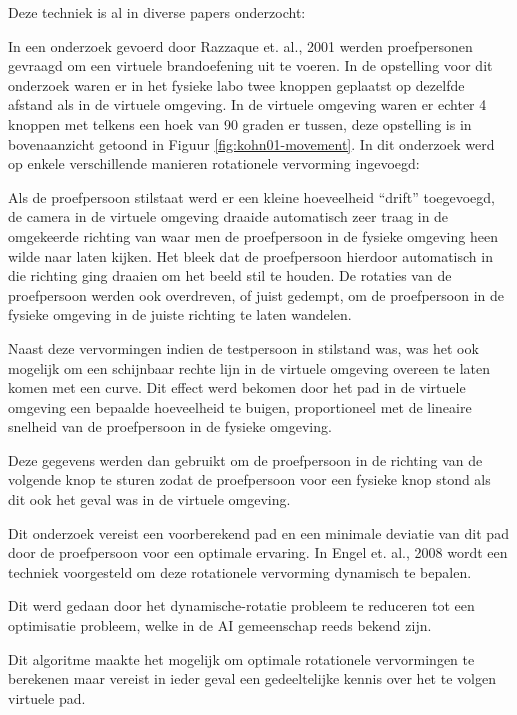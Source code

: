 Deze techniek is al in diverse papers onderzocht:

In een onderzoek gevoerd door Razzaque et. al., 2001 \cite{kohn01} werden 
proefpersonen gevraagd om een virtuele brandoefening uit te voeren. In de 
opstelling voor dit onderzoek waren er in het fysieke labo twee knoppen geplaatst
op dezelfde afstand als in de virtuele omgeving. In de virtuele omgeving waren er
echter 4 knoppen met telkens een hoek van 90 graden er tussen, deze opstelling is
in bovenaanzicht getoond in Figuur \ref{fig:kohn01-movement}. In dit onderzoek
werd op enkele verschillende manieren rotationele vervorming ingevoegd:

Als de proefpersoon stilstaat werd er een kleine hoeveelheid ``drift'' 
toegevoegd, de camera in de virtuele omgeving draaide automatisch zeer traag in 
de omgekeerde richting van waar men de proefpersoon in de fysieke omgeving heen 
wilde naar laten kijken. Het bleek dat de proefpersoon hierdoor automatisch in
die richting ging draaien om het beeld stil te houden. De rotaties van de
proefpersoon werden ook overdreven, of juist gedempt, om de proefpersoon in de
fysieke omgeving in de juiste richting te laten wandelen.

Naast deze vervormingen indien de testpersoon in stilstand was, was het ook
mogelijk om een schijnbaar rechte lijn in de virtuele omgeving overeen te laten
komen met een curve. Dit effect werd bekomen door het pad in de virtuele omgeving
een bepaalde hoeveelheid te buigen, proportioneel met de lineaire snelheid van
de proefpersoon in de fysieke omgeving.


Deze gegevens werden dan gebruikt om de proefpersoon in de richting van de 
volgende knop te sturen zodat de proefpersoon voor een fysieke knop stond als dit 
ook het geval was in de virtuele omgeving.

Dit onderzoek vereist een voorberekend pad en een minimale deviatie van dit pad 
door de proefpersoon voor een optimale ervaring. In Engel et. al., 2008 
\cite{engel08} wordt een techniek voorgesteld om deze rotationele vervorming 
dynamisch te bepalen.

Dit werd gedaan door het dynamische-rotatie probleem te reduceren tot een 
optimisatie probleem, welke in de AI gemeenschap reeds bekend zijn.

Dit algoritme maakte het mogelijk om optimale rotationele vervormingen te 
berekenen maar vereist in ieder geval een gedeeltelijke kennis over het te volgen
virtuele pad.

